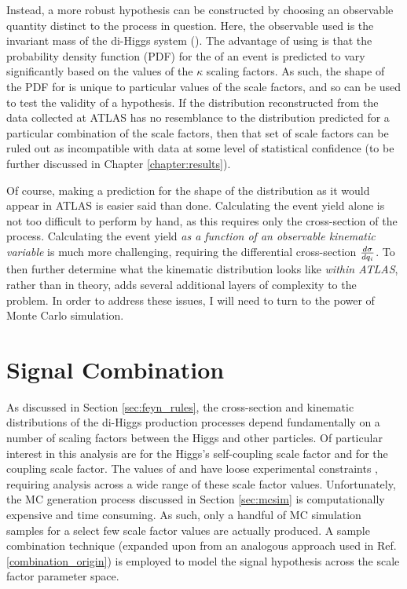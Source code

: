     Instead, a more robust hypothesis can be constructed by choosing an observable quantity distinct to the process in question.
    Here, the observable used is the invariant mass of the di-Higgs system (\mhh).
    The advantage of using \mhh is that the probability density function (PDF) for the \mhh of an event
        is predicted to vary significantly based on the values of the $\kappa$ scaling factors.
    As such, the shape of the PDF for \mhh is unique to particular values of the scale factors, 
        and so can be used to test the validity of a hypothesis.
    If the \mhh distribution reconstructed from the data collected at ATLAS has no resemblance to
        the \mhh distribution predicted for a particular combination of the scale factors,
        then that set of scale factors can be ruled out as incompatible with data
        at some level of statistical confidence
        (to be further discussed in Chapter \ref{chapter:results}).

    Of course, making a prediction for the shape of the \mhh distribution as it would appear in ATLAS is easier said than done.
    Calculating the event yield alone is not too difficult to perform by hand,
        as this requires only the cross-section of the process.
    Calculating the event yield \textit{as a function of an observable kinematic variable} is much more challenging,
        requiring the differential cross-section $\frac{d \sigma}{d q_i}$.
    To then further determine what the kinematic distribution looks like \textit{within ATLAS}, rather than in theory,
        adds several additional layers of complexity to the problem.
    In order to address these issues, I will need to turn to the power of Monte Carlo simulation.



\FloatBarrier
\section{Signal Combination} \label{sec:signal_combination}

    As discussed in Section \ref{sec:feyn_rules},
        the cross-section and kinematic distributions of the di-Higgs production processes
        depend fundamentally on a number of scaling factors between the Higgs and other particles.
    Of particular interest in this analysis are \kl for the Higgs's self-coupling scale factor and \kvv for the \HHVV coupling scale factor.
    The values of \kl and \kvv have loose experimental constraints \cite{EXOT-2016-31} \cite{HDBS-2018-18-witherratum} \cite{ATLAS-CONF-2019-049},
        requiring analysis across a wide range of these scale factor values.
    Unfortunately, the MC generation process discussed in Section \ref{sec:mcsim} is computationally expensive and time consuming.
    As such, only a handful of MC simulation samples for a select few scale factor values are actually produced.
    A sample combination technique 
        (expanded upon from an analogous approach used in Ref. \ref{combination_origin})
        is employed to model the signal hypothesis across the scale factor parameter space.

